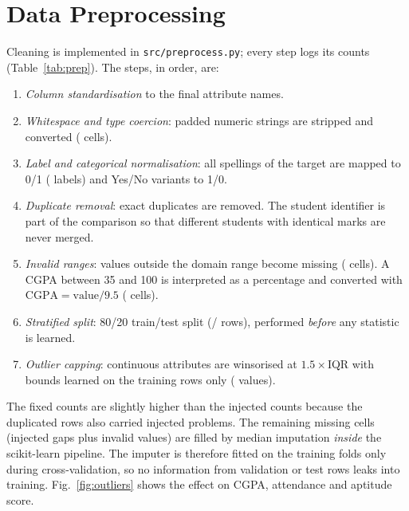 \documentclass[conference]{IEEEtran}
\begin{document}
\section{Data Preprocessing}\label{sec:prep}
Cleaning is implemented in \texttt{src/preprocess.py}; every step logs its counts
(Table~\ref{tab:prep}). The steps, in order, are:
\begin{enumerate}
  \item \emph{Column standardisation} to the final attribute names.
  \item \emph{Whitespace and type coercion}: padded numeric strings are stripped and converted
        (\TypeNoise{} cells).
  \item \emph{Label and categorical normalisation}: all spellings of the target are mapped to 0/1
        (\LabelsFixed{} labels) and Yes/No variants to 1/0.
  \item \emph{Duplicate removal}: \DupRemoved{} exact duplicates are removed. The student identifier is part of
        the comparison so that different students with identical marks are never merged.
  \item \emph{Invalid ranges}: values outside the domain range become missing (\InvalidNaN{} cells). A CGPA
        between 35 and 100 is interpreted as a percentage and converted with $\text{CGPA}=\text{value}/9.5$
        (\CgpaConverted{} cells).
  \item \emph{Stratified split}: 80/20 train/test split (\TrainRows{}/\TestRows{} rows), performed
        \emph{before} any statistic is learned.
  \item \emph{Outlier capping}: continuous attributes are winsorised at $1.5\times$IQR with bounds learned on the
        training rows only (\Capped{} values).
\end{enumerate}
The fixed counts are slightly higher than the injected counts because the duplicated rows also carried injected
problems. The remaining \MissingTotal{} missing cells (injected gaps plus invalid values) are filled by median
imputation \emph{inside} the scikit-learn pipeline. The imputer is therefore fitted on the training folds only
during cross-validation, so no information from validation or test rows leaks into training.
Fig.~\ref{fig:outliers} shows the effect on CGPA, attendance and aptitude score.

\begin{table}[t]
\centering
\caption{Data-quality problems injected and fixed}
\label{tab:prep}

\end{table}
\end{document}

